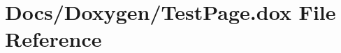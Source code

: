 \hypertarget{_test_page_8dox}{}\section{Docs/\+Doxygen/\+Test\+Page.dox File Reference}
\label{_test_page_8dox}
